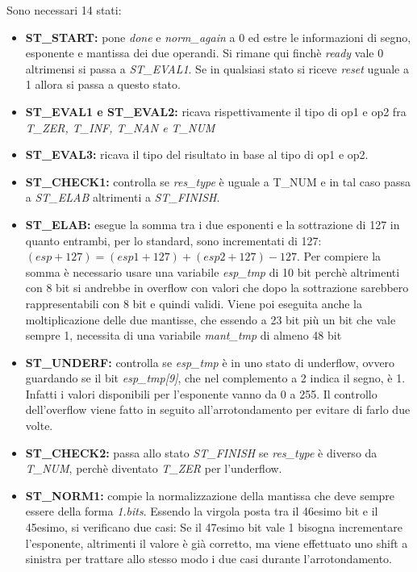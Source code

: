 \documentclass[]{IEEEtran}
\begin{document}
Sono  necessari 14 stati:
\begin{itemize}
    \item \textbf{ST\_START:} pone \textit{done} e \textit{norm\_again} a 0 ed estre le informazioni di segno, esponente e mantissa dei due operandi. Si rimane qui finchè \textit{ready} vale 0 altrimensi si passa a \textit{ST\_EVAL1}. Se in qualsiasi stato si riceve \textit{reset} uguale a 1 allora si passa a questo stato.
    \item \textbf{ST\_EVAL1 e ST\_EVAL2:} ricava rispettivamente il tipo di op1 e op2 fra \textit{T\_ZER, T\_INF, T\_NAN e T\_NUM}
    \item \textbf{ST\_EVAL3:} ricava il tipo del risultato in base al tipo di op1 e op2.
    \item \textbf{ST\_CHECK1:} controlla se \textit{res\_type} è uguale a T\_NUM e in tal caso passa a \textit{ST\_ELAB} altrimenti a \textit{ST\_FINISH}.
    \item \textbf{ST\_ELAB:} esegue la somma tra i due esponenti e la sottrazione di 127 in quanto entrambi, per lo standard, sono incrementati di 127: $(esp+127) = (esp1+127)+(esp2+127)-127$. Per compiere la somma è necessario usare una variabile \textit{esp\_tmp} di 10 bit perchè altrimenti con 8 bit si andrebbe in overflow con valori che dopo la sottrazione sarebbero rappresentabili con 8 bit e quindi validi. Viene poi eseguita anche la moltiplicazione delle due mantisse, che essendo a 23 bit più un bit che vale sempre 1, necessita di una variabile \textit{mant\_tmp} di almeno 48 bit
    \item \textbf{ST\_UNDERF:} controlla se \textit{esp\_tmp} è in uno stato di underflow, ovvero guardando se il bit \textit{esp\_tmp[9]}, che nel complemento a 2 indica il segno, è 1. Infatti i valori disponibili per l'esponente vanno da 0 a 255. Il controllo dell'overflow viene fatto in seguito all'arrotondamento per evitare di farlo due volte.
    \item \textbf{ST\_CHECK2:} passa allo stato \textit{ST\_FINISH} se \textit{res\_type} è diverso da \textit{T\_NUM}, perchè diventato \textit{T\_ZER} per l'underflow.
    \item \textbf{ST\_NORM1:} compie la normalizzazione della mantissa che deve sempre essere della forma \textit{1.bits}. Essendo la virgola posta tra il 46esimo bit e il 45esimo, si verificano due casi: Se il 47esimo bit vale 1 bisogna incrementare l'esponente, altrimenti il valore è già corretto, ma viene effettuato uno shift a sinistra per trattare allo stesso modo i due casi durante l'arrotondamento.

\end{itemize}
\end{document}
